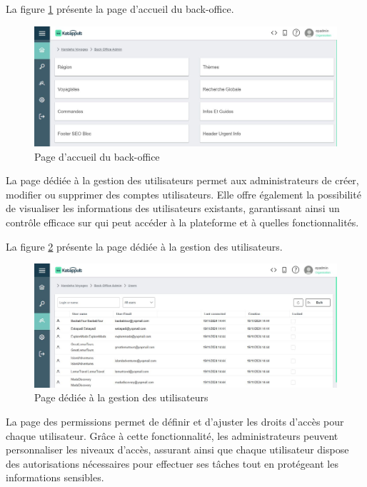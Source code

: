 \documentclass[12pt]{report}
\begin{document}
		La figure \ref{fig:katappultAccueil} présente la page d’accueil du back-office.

		\begin{figure}[h]
			\centering
			\includegraphics[width=\textwidth]{katappultAccueil.png}
			\caption{Page d’accueil du back-office}
			\label{fig:katappultAccueil}
		\end{figure}
		\FloatBarrier

		La page dédiée à la gestion des utilisateurs permet aux administrateurs de créer, modifier ou supprimer des comptes utilisateurs. Elle offre également la possibilité de visualiser les informations des utilisateurs existants, garantissant ainsi un contrôle efficace sur qui peut accéder à la plateforme et à quelles fonctionnalités.

		La figure \ref{fig:katappultUser} présente la page dédiée à la gestion des utilisateurs.

		\begin{figure}[h]
			\centering
			\includegraphics[width=\textwidth]{katappultUser.png}
			\caption{Page dédiée à la gestion des utilisateurs}
			\label{fig:katappultUser}
		\end{figure}
		\FloatBarrier

		La page des permissions permet de définir et d'ajuster les droits d'accès pour chaque utilisateur. Grâce à cette fonctionnalité, les administrateurs peuvent personnaliser les niveaux d'accès, assurant ainsi que chaque utilisateur dispose des autorisations nécessaires pour effectuer ses tâches tout en protégeant les informations sensibles. 
\end{document}
